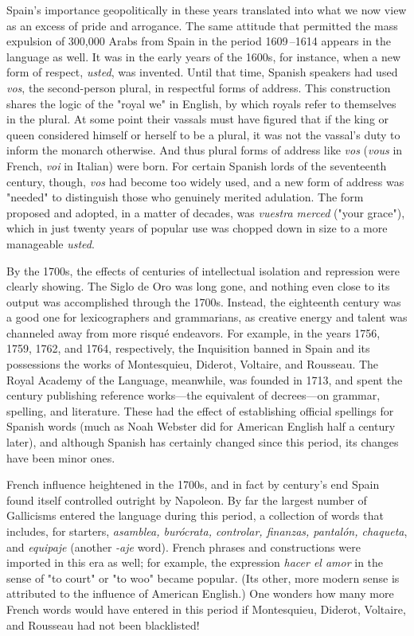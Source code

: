 Spain's importance geopolitically in these years translated into
what we now view as an excess of pride and arrogance. The same attitude that permitted the mass expulsion of 300,000 Arabs from Spain
in the period 1609\,--1614 appears in the language as well. It was in
the early years of the 1600s, for instance, when a new form of respect,
\emph{usted}, was invented. Until that time, Spanish speakers had used \emph{vos},
the second-person plural, in respectful forms of address. This construction shares the logic of the "royal we" in English, by which royals refer to themselves in the plural. At some point their vassals must have
figured that if the king or queen considered himself or herself to be a
plural, it was not the vassal's duty to inform the monarch otherwise.
And thus plural forms of address like \emph{vos} (\emph{vous} in French, \emph{voi} in Italian) were born. For certain Spanish lords of the seventeenth century,
though, \emph{vos} had become too widely used, and a new form of address
was "needed" to distinguish those who genuinely merited adulation.
The form proposed and adopted, in a matter of decades, was \emph{vuestra
merced} ("your grace"), which in just twenty years of popular use was
chopped down in size to a more manageable \emph{usted}.

By the 1700s, the effects of centuries of intellectual isolation
and repression were clearly showing. The Siglo de Oro was long gone,
and nothing even close to its output was accomplished through the
1700s. Instead, the eighteenth century was a good one for lexicographers and grammarians, as creative energy and talent was channeled
away from more risqué endeavors. For example, in the years 1756,
1759, 1762, and 1764, respectively, the Inquisition banned in Spain and
its possessions the works of Montesquieu, Diderot, Voltaire, and Rousseau. The Royal Academy of the Language, meanwhile, was founded in
1713, and spent the century publishing reference works---the equivalent of decrees---on grammar, spelling, and literature. These had the
effect of establishing official spellings for Spanish words (much as
Noah Webster did for American English half a century later), and although Spanish has certainly changed since this period, its changes
have been minor ones.

French influence heightened in the 1700s, and in fact by century's end Spain found itself controlled outright by Napoleon. By far
the largest number of Gallicisms entered the language during this period, a collection of words that includes, for starters, \emph{asamblea, burócrata, controlar, finanzas, pantalón, chaqueta}, and \emph{equipaje} (another
\emph{-aje} word). French phrases and constructions were imported in this era
as well; for example, the expression \emph{hacer el amor} in the sense of "to
court" or "to woo" became popular. (Its other, more modern sense is
attributed to the influence of American English.) One wonders how
many more French words would have entered in this period if Montesquieu, Diderot, Voltaire, and Rousseau had not been blacklisted!

